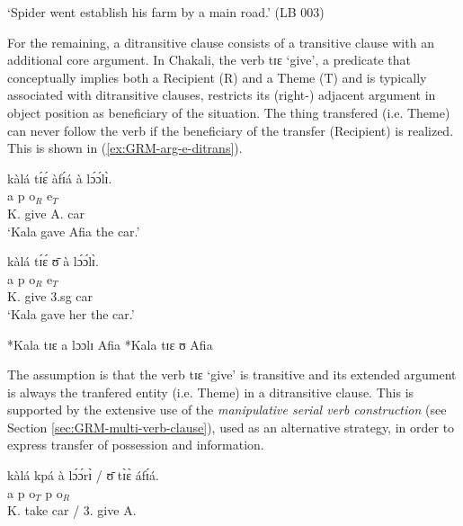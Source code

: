 \glt  `Spider went establish his farm by a main road.' (LB 003)

\z

For the remaining, a ditransitive clause consists of a transitive clause with an
additional core argument.  In Chakali, the verb {\sls tɪɛ} `give', a predicate 
that conceptually implies both a Recipient (R)  and a Theme (T) and is typically
associated with ditransitive clauses, restricts its (right-) adjacent argument
in object position as  beneficiary of the situation. The thing transfered
(i.e. Theme) can never follow the verb if the beneficiary of the transfer
(Recipient) is realized. This is shown in (\ref{ex:GRM-arg-e-ditrans}).

\ea\label{ex:GRM-arg-e-ditrans}

 \ea\label{ex:GRM-arg-e-ditrans-ben-the-1}
\glll kàlá tɪ́ɛ́ àfɪ́á {à lɔ́ɔ́lɪ̀}.\\
{\sc a} {\sc p} {\sc o}$_{R}$ {\sc e}$_{T}$\\
K. give A.  {{\art} car}\\

\glt  `Kala gave Afia the car.' 

 \ex\label{ex:GRM-arg-e-ditrans-ben-the-2}
\glll  kàlá tɪ́ɛ́ ʊ̄  {à lɔ́ɔ́lɪ̀}.\\
{\sc a} {\sc p} {\sc o}$_{R}$ {\sc e}$_{T}$\\
K. give {\sc 3.sg}  {{\art} car}\\

  `Kala gave her  the car.' 

 \ex\label{ex:GRM-arg-e-ditrans-the-ben-1}
 *Kala tɪɛ a lɔɔlɪ Afia 
 \ex\label{ex:GRM-arg-e-ditrans-the-ben-2}
*Kala tɪɛ ʊ Afia 

\z 
 \z

The assumption is that the verb {\sls tɪɛ} `give'  is transitive and its
extended argument is always the tranfered entity (i.e.
Theme) in a ditransitive clause. This is supported by the extensive use of the 
{\it manipulative serial verb construction} (see Section
\ref{sec:GRM-multi-verb-clause}), used as an alternative strategy,  in order to
express transfer of
possession  and information.



\ea\label{ex:GRM-m-svc-give}
\glll  kàlá kpá  {à lɔ́ɔ́rɪ̀ / ʊ̄} tɪ̀ɛ̀ áfɪ́á.\\
{\sc a} {\sc p} {\sc o}$_{T}$  {\sc p}  {\sc o}$_{R}$\\
K. take  {{\art} car / 3.\sg} give A.\\

